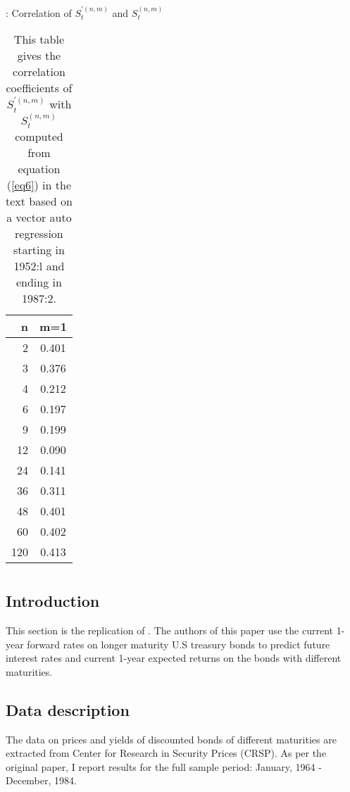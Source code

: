 \documentclass[11pt]{article}
\begin{document}
\begin{table}[H]
\centering
\caption{: Correlation of $S_{t}^{\prime (n,m)}$  and $S_{t}^{(n,m)}$} \label{tab:CS3}
\caption*{This table gives the correlation coefficients of $S_{t}^{\prime (n,m)}$ with $S_{t}^{(n,m)}$ computed from equation (\ref{eq6}) in the text based on a vector auto regression starting in 1952:l and ending in 1987:2.}
\begin{tabular}{rc}
  \hline
n & m=1 \\ 
  \hline
2 & 0.401 \\ 
  3 & 0.376 \\ 
  4 & 0.212 \\ 
  6 & 0.197 \\ 
  9 & 0.199 \\ 
  12 & 0.090 \\ 
  24 & 0.141 \\ 
  36 & 0.311 \\ 
  48 & 0.401 \\ 
  60 & 0.402 \\ 
  120 & 0.413 \\ 
   \hline
\end{tabular}
\end{table}

\clearpage



\section{\cite{fama1987information}} \label{sec:CS}

\subsection{Introduction}
This section is the replication of \cite{fama1987information}. The authors of this paper use the current 1-year forward rates on longer maturity U.S treasury bonds to predict future interest rates and current 1-year expected returns on the bonds with different maturities. 

\subsection{Data description}
The data on prices and yields of discounted bonds of different maturities are extracted from Center for Research in Security Prices (CRSP). As per the original paper, I report results for the full sample period: January, 1964 - December, 1984.
\end{document}

